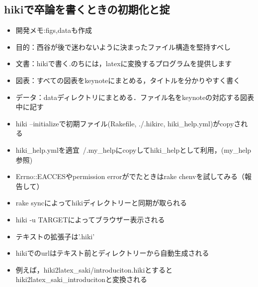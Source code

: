 \documentclass[12pt,a4paper]{jsarticle}
\begin{document}
\subsection{hikiで卒論を書くときの初期化と掟}\begin{itemize}
\item 開発メモ:figs,dataも作成
\item 目的：西谷が後で迷わないように決まったファイル構造を堅持すべし
\item 文書：hikiで書く.のちには，latexに変換するプログラムを提供します
\item 図表：すべての図表をkeynoteにまとめる，タイトルを分かりやすく書く
\item データ：dataディレクトリにまとめる．ファイル名をkeynoteの対応する図表中に記す
\item hiki --initializeで初期ファイル(Rakefile, ./.hikirc, hiki\_help.yml)がcopyされる
\item hiki\_help.ymlを適宜~/.my\_helpにcopyしてhiki\_helpとして利用，(my\_help参照)
\item Errno::EACCESやpermission errorがでたときはrake chenvを試してみる（報告して）
\item rake syncによってhikiディレクトリーと同期が取られる
\item hiki -u TARGETによってブラウザー表示される
\item テキストの拡張子は'.hiki'
\item hikiでのurlはテキスト前とディレクトリーから自動生成される
\item 例えば，hiki2latex\_saki/introduciton.hikiとするとhiki2latex\_saki\_introducitonと変換される
\end{itemize}
\end{document}
